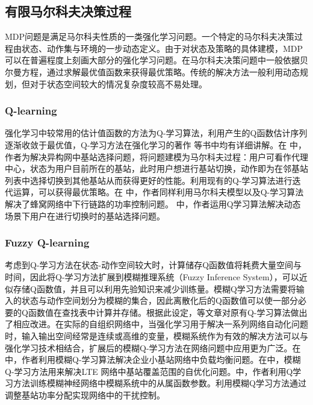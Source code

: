 \documentclass{IEEEtran}
\begin{document}

\subsection{有限马尔科夫决策过程}
MDP问题是满足马尔科夫性质的一类强化学习问题。一个特定的马尔科夫决策过程由状态、动作集与环境的一步动态定义。由于对状态及策略的具体建模，MDP可以在普遍程度上刻画大部分的强化学习问题。在马尔科夫决策问题中一般依据贝尔曼方程，通过求解最优值函数来获得最优策略。传统的解决方法一般利用动态规划，但对于状态空间较大的情况复杂度较高不易处理。

\subsubsection{Q-learning}
强化学习中较常用的估计值函数的方法为Q-学习算法，利用产生的Q函数估计序列逐渐收敛于最优值，Q-学习方法在强化学习的著作
\cite{Sutton2016}等书中均有详细讲解。在\cite{Simsek2015} 中，作者为解决异构网中基站选择问题，将问题建模为马尔科夫过程：用户可看作代理中心，状态为用户目前所在的基站，此时用户想进行基站切换，动作即为在邻基站列表中选择切换到其他基站从而获得更好的性能。利用现有的Q-学习算法进行迭代运算，可以获得最优策略。在
\cite{Ghadimi2017} 中，作者同样利用马尔科夫模型以及Q-学习算法解决了蜂窝网络中下行链路的功率控制问题。
\cite{Dhahri2012}中，作者运用Q学习算法解决动态场景下用户在进行切换时的基站选择问题。

\subsubsection{Fuzzy Q-learning}
考虑到Q-学习方法在状态-动作空间较大时，计算储存Q函数值将耗费大量空间与时间，因此将Q-学习方法扩展到模糊推理系统（Fuzzy Inference System），可以近似存储Q函数值，并且可以利用先验知识来减少训练量。模糊Q学习方法需要将输入的状态与动作空间划分为模糊的集合，因此离散化后的Q函数值可以使一部分必要的Q函数值在查找表中计算并存储。根据此设定，\cite{Glorennec1997}等文章对原有Q-学习算法做出了相应改进。在实际的自组织网络中，当强化学习用于解决一系列网络自动化问题时，输入输出空间经常是连续或高维的变量，模糊系统作为有效的解决方法可以与强化学习技术相结合，扩展后的模糊Q-学习方法在网络问题中应用更为广泛。在
\cite{Munoz2013} 中，作者利用模糊Q-学习算法解决企业小基站网络中负载均衡问题。在\cite{Razavi2010}中，模糊Q-学习方法用来解决LTE 网络中基站覆盖范围的自优化问题。\cite{Fan2014}中，作者利用Q学习方法训练模糊神经网络中模糊系统中的从属函数参数。\cite{Dirani2010}利用模糊Q学习方法通过调整基站功率分配实现网络中的干扰控制。
\end{document}
